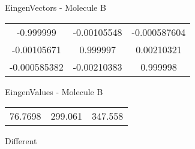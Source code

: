 \begin{multicols}{2}
\begin{center}
\vtab
 EingenVectors - Molecule B     \\
\vtab
\begin{tabular}{|c c c|}
-0.999999	 & 	-0.00105548	 & 	-0.000587604	 \\
-0.00105671	 & 	0.999997	 & 	0.00210321	 \\
-0.000585382	 & 	-0.00210383	 & 	0.999998
\end{tabular}

\vtab
 EingenValues - Molecule B     \\
\vtab
\begin{tabular}{|c c c|}
76.7698	 & 	299.061	 & 	347.558	 \\
\end{tabular}

\end{center}
\end{multicols}
\begin{center}
\vtab
\vtab
\textcolor{NavyBlue}{\Large Different}
\end{center}

 \newpage

